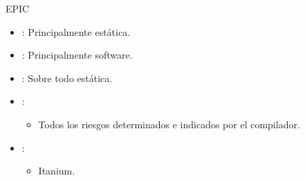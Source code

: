 \begin{frame}[t]{EPIC}
\begin{itemize}
  \item {}: Principalmente estática.
  \item {}: Principalmente software.
  \item {}: Sobre todo estática.
  \item {}:
    \begin{itemize}
      \item Todos los riesgos determinados e indicados por el compilador.
    \end{itemize}
  
  \item {}: 
    \begin{itemize}
      \item Itanium.
    \end{itemize}
\end{itemize}
\end{frame}

